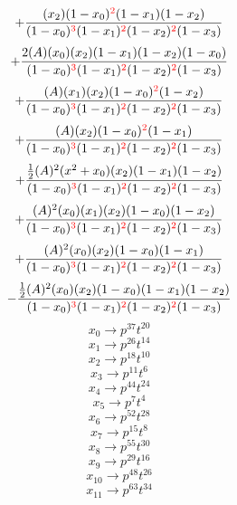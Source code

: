 \documentclass{article}
\begin{document}
\[+\frac{(x_2)(1-x_0)^{\textcolor{red}{2}}(1-x_1)(1-x_2)}{(1-x_0)^{\textcolor{red}{3}}(1-x_1)^{\textcolor{red}{2}}(1-x_2)^{\textcolor{red}{2}}(1-x_3)}\]\[+\frac{2(A)(x_0)(x_2)(1-x_1)(1-x_2)(1-x_0)}{(1-x_0)^{\textcolor{red}{3}}(1-x_1)^{\textcolor{red}{2}}(1-x_2)^{\textcolor{red}{2}}(1-x_3)}\]\[+\frac{(A)(x_1)(x_2)(1-x_0)^{\textcolor{red}{2}}(1-x_2)}{(1-x_0)^{\textcolor{red}{3}}(1-x_1)^{\textcolor{red}{2}}(1-x_2)^{\textcolor{red}{2}}(1-x_3)}\]\[+\frac{(A)(x_2)(1-x_0)^{\textcolor{red}{2}}(1-x_1)}{(1-x_0)^{\textcolor{red}{3}}(1-x_1)^{\textcolor{red}{2}}(1-x_2)^{\textcolor{red}{2}}(1-x_3)}\]\[+\frac{\frac{1}{2}(A)^{2}(x^{2}+x_0)(x_2)(1-x_1)(1-x_2)}{(1-x_0)^{\textcolor{red}{3}}(1-x_1)^{\textcolor{red}{2}}(1-x_2)^{\textcolor{red}{2}}(1-x_3)}\]\[+\frac{(A)^{2}(x_0)(x_1)(x_2)(1-x_0)(1-x_2)}{(1-x_0)^{\textcolor{red}{3}}(1-x_1)^{\textcolor{red}{2}}(1-x_2)^{\textcolor{red}{2}}(1-x_3)}\]\[+\frac{(A)^{2}(x_0)(x_2)(1-x_0)(1-x_1)}{(1-x_0)^{\textcolor{red}{3}}(1-x_1)^{\textcolor{red}{2}}(1-x_2)^{\textcolor{red}{2}}(1-x_3)}\]\[-\frac{\frac{1}{2}(A)^{2}(x_0)(x_2)(1-x_0)(1-x_1)(1-x_2)}{(1-x_0)^{\textcolor{red}{3}}(1-x_1)^{\textcolor{red}{2}}(1-x_2)^{\textcolor{red}{2}}(1-x_3)}\]\[x_0\rightarrow{p^{37}t^{20}}\]\[x_1\rightarrow{p^{26}t^{14}}\]\[x_2\rightarrow{p^{18}t^{10}}\]\[x_3\rightarrow{p^{11}t^{6}}\]\[x_4\rightarrow{p^{44}t^{24}}\]\[x_5\rightarrow{p^{7}t^{4}}\]\[x_6\rightarrow{p^{52}t^{28}}\]\[x_7\rightarrow{p^{15}t^{8}}\]\[x_8\rightarrow{p^{55}t^{30}}\]\[x_9\rightarrow{p^{29}t^{16}}\]\[x_10\rightarrow{p^{48}t^{26}}\]\[x_11\rightarrow{p^{63}t^{34}}\]
\end{document}
